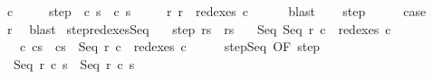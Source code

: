 \begin{isabellebody}
\ c{\isacharprime}{\isacharprime}\ \isanewline
\ \ \ \ step{\isacharcolon}\ {\isachardoublequoteopen}{\isasymGamma}{\isasymturnstile}\ {\isacharparenleft}c{\isacharprime}{\isacharcomma}\ s{\isacharprime}{\isacharparenright}\ {\isasymrightarrow}\ {\isacharparenleft}c{\isacharprime}{\isacharprime}{\isacharcomma}\ s{\isacharprime}{\isacharprime}{\isacharparenright}{\isachardoublequoteclose}\ \isanewline
\ \ \ \ r{\isacharprime}{\isacharprime}{\isacharcolon}\ {\isachardoublequoteopen}r{\isacharprime}{\isacharprime}\ {\isasymin}\ redexes\ c{\isacharprime}{\isacharprime}{\isachardoublequoteclose}\isanewline
\ \ \ \ \isamarkupfalse%
\ blast\isanewline
\ \ \isamarkupfalse%
\ step\isanewline
\ \ \isamarkupfalse%
\ \isamarkupfalse%
\ {\isacharquery}case\isanewline
\ \ \ \ \isamarkupfalse%
\ r{\isacharprime}{\isacharprime}\ \isamarkupfalse%
\ blast\isanewline
{}\isamarkupfalse%
%
\endisatagproof
{\isafoldproof}%
%
\isadelimproof
\isanewline
%
\endisadelimproof
\isanewline
{}\isamarkupfalse%
\ step{\isacharunderscore}redexes{\isacharunderscore}Seq{\isacharcolon}\isanewline
\ \ \ step{\isacharcolon}\ {\isachardoublequoteopen}{\isasymGamma}{\isasymturnstile}{\isacharparenleft}r{\isacharcomma}s{\isacharparenright}\ {\isasymrightarrow}\ {\isacharparenleft}r{\isacharprime}{\isacharcomma}s{\isacharprime}{\isacharparenright}{\isachardoublequoteclose}\isanewline
\ \ \ Seq{\isacharcolon}\ {\isachardoublequoteopen}Seq\ r\ c\ {\isasymin}\ redexes\ c{\isachardoublequoteclose}\isanewline
\ \ \ {\isachardoublequoteopen}{\isasymexists}c{\isacharprime}{\isachardot}\ {\isasymGamma}{\isasymturnstile}{\isacharparenleft}c{\isacharcomma}s{\isacharparenright}\ {\isasymrightarrow}\ {\isacharparenleft}c{\isacharprime}{\isacharcomma}s{\isacharprime}{\isacharparenright}\ {\isasymand}\ Seq\ r{\isacharprime}\ c\ {\isasymin}\ redexes\ c{\isacharprime}{\isachardoublequoteclose}\isanewline
%
\isadelimproof
%
\endisadelimproof
%
\isatagproof
{}\isamarkupfalse%
\ {\isacharminus}\isanewline
\ \ \isamarkupfalse%
\ step{\isachardot}Seq\ {\isacharbrackleft}OF\ step{\isacharbrackright}\isanewline
\ \ \isamarkupfalse%
\ {\isachardoublequoteopen}{\isasymGamma}{\isasymturnstile}\ {\isacharparenleft}Seq\ r\ c\ s{\isacharparenright}\ {\isasymrightarrow}\ {\isacharparenleft}Seq\ r{\isacharprime}\ c\ s{\isacharprime}{\isacharparenright}{\isachardoublequoteclose}\isacommand{{\isachardot}}\isamarkupfalse%

\end{isabellebody}

